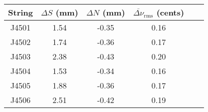\begin{tabular}{cccccc}
\toprule
String & $\Delta S$ (mm) & $\Delta N$ (mm) & $\overline{\Delta \nu}_\text{rms}$ (cents) \\
\midrule
J4501 & 1.54 & -0.35 & 0.16 \\
J4502 & 1.74 & -0.36 & 0.17 \\
J4503 & 2.38 & -0.43 & 0.20 \\
J4504 & 1.53 & -0.34 & 0.16 \\
J4505 & 1.88 & -0.36 & 0.17 \\
J4506 & 2.51 & -0.42 & 0.19 \\
\bottomrule
\end{tabular}

